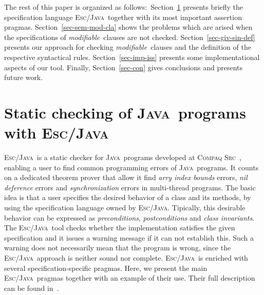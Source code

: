 \documentclass[a4paper]{llncs}
\newcommand{\escj}{\textsc{Esc/Java}}
\newcommand{\java}{\textsc{Java}}
\newcommand{\csrc}{\textsc{Compaq Src}}
\newcommand{\modif}{\textit{modifiable}}
\begin{document}
The rest of this paper is organized as follows$:$
Section~\ref{sec-esc-prg} presents briefly the specification language
\escj~together with its most important assertion
pragmas. Section~\ref{sec-sem-mod-cla} shows the problems which are
arised when the specifications of \modif~clauses are not
checked. Section~\ref{sec-giv-sin-def}
presents our approach for checking \modif~clauses and the definition
of the respective syntactical rules. Section~\ref{sec-imp-iss} presents
some implementational aspects of our tool. Finally, Section~\ref{sec-con}
gives conclusions and presents future work.






\section{Static checking of \java~programs with \escj}
\label{sec-esc-prg}
\escj~is a static checker for \java~programs developed
at \csrc~\cite{ESC}, enabling a user to find common programming
errors of \java~programs. It counts on a dedicated theorem prover
that allow it find \emph{arry index bounds}
errors, \emph{nil deference} errors and \emph{synchronization} errors
in multi-thread programs. The basic idea is that
a user specifies the desired behavior of a class and its methods, by
using the specification language owned by \escj. Tipically, this
desirable behavior can be expressed as \textit{preconditions},
\textit{postconditions} and \textit{class invariants}. The \escj~tool
checks whether the implementation satisfies the given
specification and it issues a warning 
message if it can not establish this. Such a
warning does not necessarily mean that the program is
wrong, since the \escj~approach is neither sound nor
complete. \escj~is enriched with several
specification-specific pragmas. Here, we present
the main \escj~pragmas together with an example of their
use. Their full description can be found in~\cite{LeinoNS00}. 
\end{document}
